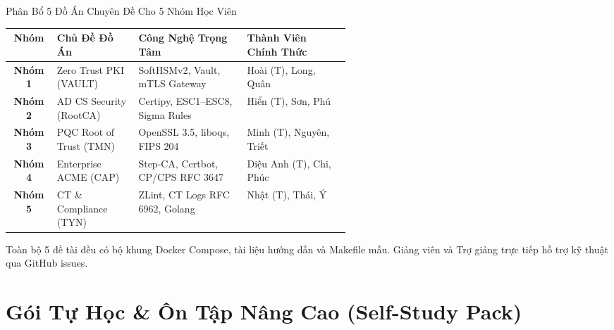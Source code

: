 \begin{frame}{Phân Bổ 5 Đồ Án Chuyên Đề Cho 5 Nhóm Học Viên}
  \begin{table}[h]
    \centering\scriptsize
    \begin{tabularx}{\linewidth}{@{}c p{0.24\linewidth} p{0.32\linewidth} X@{}}
      \toprule
      \textbf{Nhóm} & \textbf{Chủ Đề Đồ Án} & \textbf{Công Nghệ Trọng Tâm} & \textbf{Thành Viên Chính Thức} \\
      \midrule
      \textbf{Nhóm 1} & Zero Trust PKI (VAULT) & SoftHSMv2, Vault, mTLS Gateway & Hoài (T), Long, Quân \\
      \textbf{Nhóm 2} & AD CS Security (RootCA) & Certipy, ESC1--ESC8, Sigma Rules & Hiển (T), Sơn, Phú \\
      \textbf{Nhóm 3} & PQC Root of Trust (TMN) & OpenSSL 3.5, liboqs, FIPS 204 & Minh (T), Nguyên, Triết \\
      \textbf{Nhóm 4} & Enterprise ACME (CAP) & Step-CA, Certbot, CP/CPS RFC 3647 & Diệu Anh (T), Chi, Phúc \\
      \textbf{Nhóm 5} & CT \& Compliance (TYN) & ZLint, CT Logs RFC 6962, Golang & Nhật (T), Thái, Ý \\
      \bottomrule
    \end{tabularx}
  \end{table}

  \begin{keybox}
    Toàn bộ 5 đề tài đều có bộ khung Docker Compose, tài liệu hướng dẫn và Makefile mẫu. Giảng viên và Trợ giảng trực tiếp hỗ trợ kỹ thuật qua GitHub issues.
  \end{keybox}
\end{frame}

\appendix
\section{Gói Tự Học \& Ôn Tập Nâng Cao (Self-Study Pack)}

